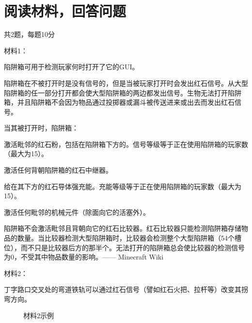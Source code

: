 \documentclass{exampaper}
\begin{document}
        \section{阅读材料，回答问题}{共2题，每题10分} %
            \begin{material}
                \noindent \heiti 材料1： \fangsong

                陷阱箱可用于检测玩家何时打开了它的GUI。

                陷阱箱在不被打开时是没有信号的，但是当被玩家打开时会发出红石信号。从大型陷阱箱的任一部分打开都会使大型陷阱箱的两边都发出信号。生物无法打开陷阱箱，并且陷阱箱不会因为物品通过投掷器或漏斗被传送进来或出去而发出红石信号。

                当其被打开时，陷阱箱：

                \begin{compactitem}
                    \item 激活毗邻的红石粉，包括在陷阱箱下方的。信号等级等于正在使用陷阱箱的玩家数（最大为15）。
                    \item 激活任何背朝陷阱箱的红石中继器。
                    \item 给在其下方的红石导体强充能。充能等级等于正在使用陷阱箱的玩家数（最大为15）。
                    \item 激活任何毗邻的机械元件（除面向它的活塞外）。
                \end{compactitem}

                陷阱箱不会激活毗邻且背朝向它的红石比较器。红石比较器只能检测陷阱箱存储物品的数量。当比较器检测大型陷阱箱时，比较器会检测整个大型陷阱箱（54个槽位），而不只是比较器后方的那半个。无法打开的陷阱箱总会使比较器的检测信号为0，不受其中物品数量的影响。—— Minecraft Wiki

                \noindent \heiti 材料2： \fangsong

                丁字路口交叉处的弯道铁轨可以通过红石信号（譬如红石火把、拉杆等）改变其拐弯方向。

                \begin{figure}[H]
                    \centering
                        \caption{材料2示例}
                \end{figure}
            \end{material}
\end{document}
